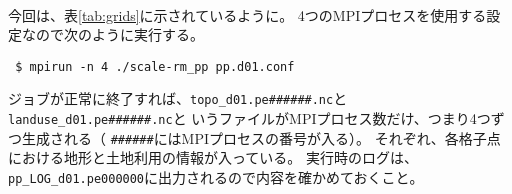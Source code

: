 \\


今回は、表\ref{tab:grids}に示されているように。
4つのMPIプロセスを使用する設定なので次のように実行する。
\begin{verbatim}
 $ mpirun -n 4 ./scale-rm_pp pp.d01.conf
\end{verbatim}
ジョブが正常に終了すれば、\verb|topo_d01.pe######.nc|と\\
\verb|landuse_d01.pe######.nc|と
いうファイルがMPIプロセス数だけ、つまり4つずつ生成される（
\verb|######|にはMPIプロセスの番号が入る）。
それぞれ、各格子点における地形と土地利用の情報が入っている。
実行時のログは、\verb|pp_LOG_d01.pe000000|に出力されるので内容を確かめておくこと。



